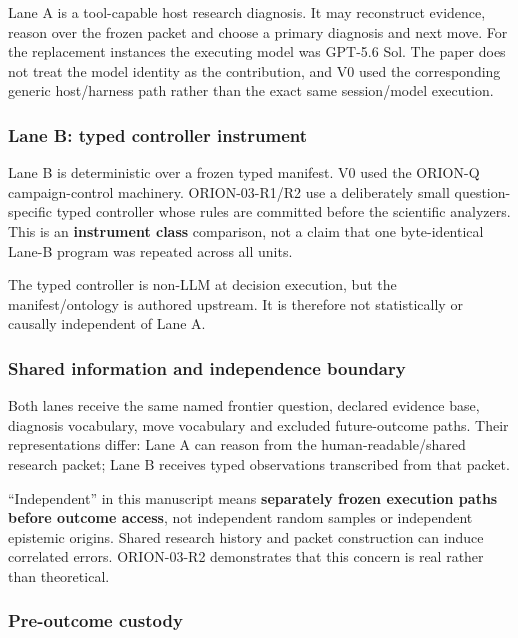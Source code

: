 \documentclass[10pt]{article}
\begin{document}
Lane A is a tool-capable host research diagnosis. It may reconstruct
evidence, reason over the frozen packet and choose a primary diagnosis
and next move. For the replacement instances the executing model was
GPT-5.6 Sol. The paper does not treat the model identity as the
contribution, and V0 used the corresponding generic host/harness path
rather than the exact same session/model execution.

\hypertarget{lane-b-typed-controller-instrument}{%
\subsubsection{Lane B: typed controller
instrument}\label{lane-b-typed-controller-instrument}}

Lane B is deterministic over a frozen typed manifest. V0 used the
ORION-Q campaign-control machinery. ORION-03-R1/R2 use a deliberately
small question-specific typed controller whose rules are committed
before the scientific analyzers. This is an \textbf{instrument class}
comparison, not a claim that one byte-identical Lane-B program was
repeated across all units.

The typed controller is non-LLM at decision execution, but the
manifest/ontology is authored upstream. It is therefore not
statistically or causally independent of Lane A.

\hypertarget{shared-information-and-independence-boundary}{%
\subsubsection{Shared information and independence
boundary}\label{shared-information-and-independence-boundary}}

Both lanes receive the same named frontier question, declared evidence
base, diagnosis vocabulary, move vocabulary and excluded future-outcome
paths. Their representations differ: Lane A can reason from the
human-readable/shared research packet; Lane B receives typed
observations transcribed from that packet.

``Independent'' in this manuscript means \textbf{separately frozen
execution paths before outcome access}, not independent random samples
or independent epistemic origins. Shared research history and packet
construction can induce correlated errors. ORION-03-R2 demonstrates that
this concern is real rather than theoretical.

\hypertarget{pre-outcome-custody}{%
\subsubsection{Pre-outcome custody}\label{pre-outcome-custody}}
\end{document}
